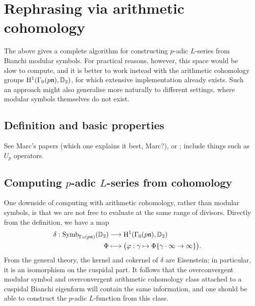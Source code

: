\documentclass[a4paper,10pt]{article}
\numberwithin{equation}{section}
\begin{document}


\section{Rephrasing via arithmetic cohomology}
The above gives a complete algorithm for constructing $p$-adic $L$-series from Bianchi modular symbols. For practical reasons, however, this space would be slow to compute, and it is better to work instead with the arithmetic cohomology groups $\mathrm{H}^1(\Gamma_0(p\mathfrak{n}),\mathbb{D}_2)$, for which extensive implementation already exists. Such an approach might also generalise more naturally to different settings, where modular symbols themselves do not exist.

\subsection{Definition and basic properties}
See Marc's papers (which one explains it best, Marc?), or  \cite{PP09}; include things such as $U_p$ operators.



\subsection{Computing \texorpdfstring{$p$}{p}-adic \texorpdfstring{$L$}{L}-series from cohomology}

One downside of computing with arithmetic cohomology, rather than modular symbols, is that we are not free to evaluate at the same range of divisors. Directly from the definition, we have a map
\begin{align*}
	\delta : \mathrm{Symb}_{\Gamma_0(p\mathfrak{n})}(\mathbb{D}_2) &\longrightarrow \mathrm{H}^1(\Gamma_0(p\mathfrak{n}),\mathbb{D}_2)\\
    \Phi &\longmapsto \big(\varphi: \gamma \mapsto \Phi\{\gamma\cdot\infty \rightarrow \infty\}\big).
\end{align*}
From the general theory, the kernel and cokernel of $\delta$ are Eisenstein; in particular, it is an isomorphism on the cuspidal part. It follows that the overconvergent modular symbol and overconvergent arithmetic cohomology class attached to a cuspidal Bianchi eigenform will contain the same information, and one should be able to construct the $p$-adic $L$-function from this class.
\end{document}

